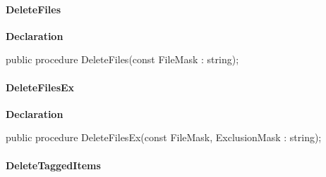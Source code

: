 \documentclass{report}
\newif\ifpdf
\begin{document}
\paragraph*{DeleteFiles}\hspace*{\fill}

\label{AbArcTyp.TAbArchive-DeleteFiles}
\begin{list}{}{
\setlength{\itemindent}{0cm}
\setlength{\listparindent}{0cm}
\setlength{\leftmargin}{\evensidemargin}
\addtolength{\leftmargin}{\tmplength}
\settowidth{\labelsep}{X}
\addtolength{\leftmargin}{\labelsep}
\setlength{\labelwidth}{\tmplength}
}
\item[\textbf{Declaration}\hfill]
\ifpdf
\begin{flushleft}
\fi
\begin{ttfamily}
public procedure DeleteFiles(const FileMask : string);\end{ttfamily}

\ifpdf
\end{flushleft}
\fi

\end{list}
\paragraph*{DeleteFilesEx}\hspace*{\fill}

\label{AbArcTyp.TAbArchive-DeleteFilesEx}
\begin{list}{}{
\setlength{\itemindent}{0cm}
\setlength{\listparindent}{0cm}
\setlength{\leftmargin}{\evensidemargin}
\addtolength{\leftmargin}{\tmplength}
\settowidth{\labelsep}{X}
\addtolength{\leftmargin}{\labelsep}
\setlength{\labelwidth}{\tmplength}
}
\item[\textbf{Declaration}\hfill]
\ifpdf
\begin{flushleft}
\fi
\begin{ttfamily}
public procedure DeleteFilesEx(const FileMask, ExclusionMask : string);\end{ttfamily}

\ifpdf
\end{flushleft}
\fi

\end{list}
\paragraph*{DeleteTaggedItems}\hspace*{\fill}
\end{document}
